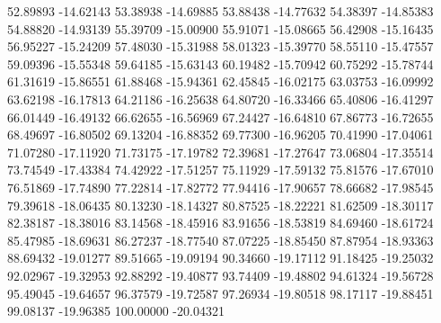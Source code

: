 {52.89893 -14.62143
53.38938 -14.69885
53.88438 -14.77632
54.38397 -14.85383
54.88820 -14.93139
55.39709 -15.00900
55.91071 -15.08665
56.42908 -15.16435
56.95227 -15.24209
57.48030 -15.31988
58.01323 -15.39770
58.55110 -15.47557
59.09396 -15.55348
59.64185 -15.63143
60.19482 -15.70942
60.75292 -15.78744
61.31619 -15.86551
61.88468 -15.94361
62.45845 -16.02175
63.03753 -16.09992
63.62198 -16.17813
64.21186 -16.25638
64.80720 -16.33466
65.40806 -16.41297
66.01449 -16.49132
66.62655 -16.56969
67.24427 -16.64810
67.86773 -16.72655
68.49697 -16.80502
69.13204 -16.88352
69.77300 -16.96205
70.41990 -17.04061
71.07280 -17.11920
71.73175 -17.19782
72.39681 -17.27647
73.06804 -17.35514
73.74549 -17.43384
74.42922 -17.51257
75.11929 -17.59132
75.81576 -17.67010
76.51869 -17.74890
77.22814 -17.82772
77.94416 -17.90657
78.66682 -17.98545
79.39618 -18.06435
80.13230 -18.14327
80.87525 -18.22221
81.62509 -18.30117
82.38187 -18.38016
83.14568 -18.45916
83.91656 -18.53819
84.69460 -18.61724
85.47985 -18.69631
86.27237 -18.77540
87.07225 -18.85450
87.87954 -18.93363
88.69432 -19.01277
89.51665 -19.09194
90.34660 -19.17112
91.18425 -19.25032
92.02967 -19.32953
92.88292 -19.40877
93.74409 -19.48802
94.61324 -19.56728
95.49045 -19.64657
96.37579 -19.72587
97.26934 -19.80518
98.17117 -19.88451
99.08137 -19.96385
100.00000 -20.04321
}

